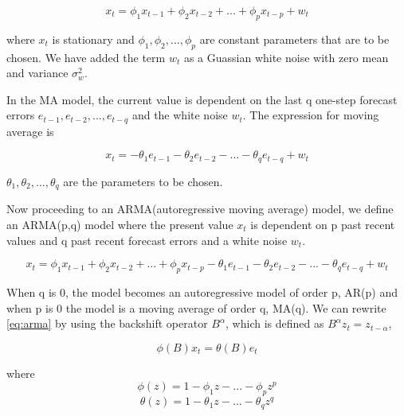         \begin{equation} \label{eq:autoregressive}
          x_{t} = \phi_{1}x_{t-1} + \phi_{2}x_{t-2} + ... + \phi_{p}x_{t-p} + w_{t}
        \end{equation}

where $x_{t}$ is stationary and $\phi_{1}, \phi_{2},..., \phi_{p}$ are constant
parameters that are to be chosen. We have added the term $w_{t}$ as a Guassian white noise with
zero mean and variance $\sigma^{2}_{w}$.

In the MA model, the current value is dependent on the last q one-step forecast errors
$e_{t-1}, e_{t-2},...,e_{t-q}$ and the white noise $w_{t}$. The expression for moving average
is

        \begin{equation} \label{eq:movingaverage}
          x_{t} = -\theta_{1}e_{t-1} - \theta_{2}e_{t-2} - ... - \theta_{q}e_{t-q} + w_{t}
        \end{equation}

$\theta_{1}, \theta_{2},..., \theta_{q}$ are the parameters to be chosen.

Now proceeding to an ARMA(autoregressive moving average) model, we define an ARMA(p,q) model
where the present value $x_{t}$ is dependent on p past recent values and q past recent forecast
errors and a white noise $w_{t}$.

        \begin{equation} \label{eq:arma}
          x_{t} = \phi_{1}x_{t-1} + \phi_{2}x_{t-2} + ... + \phi_{p}x_{t-p} - \theta_{1}e_{t-1}
          - \theta_{2}e_{t-2} - ... - \theta_{q}e_{t-q} + w_{t}
        \end{equation}

When q is 0, the model becomes an autoregressive model of order p, AR(p) and when p is 0 the model
is a moving average of order q, MA(q). We can rewrite \ref{eq:arma} by using the backshift
operator $B^{\alpha}$, which is defined as $B^{\alpha}z_{t} = z_{t-\alpha}$,

        \begin{equation} \label{eq:armarewrite}
          \phi(B)x_{t} = \theta(B)e_{t}
        \end{equation}

where
        \begin{equation}
            \phi(z) = 1 - \phi_{1}z - ... - \phi_{p}z^{p}
        \end{equation}
        \begin{equation}
            \theta(z) = 1 - \theta_{1}z - ... - \theta_{q}z^{q}
        \end{equation}

